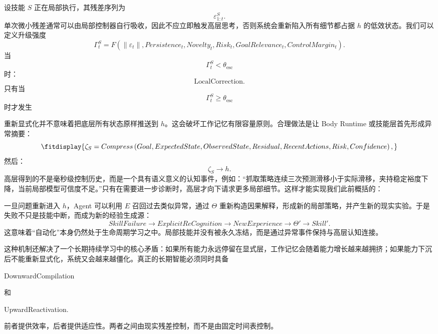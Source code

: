 设技能 $S$ 正在局部执行，其残差序列为
\[
\varepsilon_{1:t}^{S}.
\]
单次微小残差通常可以由局部控制器自行吸收，因此不应立即触发高层思考，否则系统会重新陷入所有细节都占据 $h$ 的低效状态。我们可以定义升级强度
\[
\Gamma_t^S
=
F
\left(
\|\varepsilon_t\|,
Persistence_t,
Novelty_t,
Risk_t,
GoalRelevance_t,
ControlMargin_t
\right).
\]
当
\[
\Gamma_t^S<\theta_{\mathrm{esc}}
\]
时：
\[
\mathrm{LocalCorrection}.
\]
只有当
\[
\Gamma_t^S\geq\theta_{\mathrm{esc}}
\]
时才发生
\begin{statementbox}
\centering
{}
\end{statementbox}

重新显式化并不意味着把底层所有状态原样推送到 $h$。这会破坏工作记忆有限容量原则。合理做法是让 Body Runtime 或技能层首先形成异常摘要：
\[
\fitdisplay{
\zeta_S
=
Compress
\left(
Goal,
ExpectedState,
ObservedState,
Residual,
RecentActions,
Risk,
Confidence
\right),
}
\]
然后：
\[
\zeta_S
\rightarrow h.
\]
高层得到的不是毫秒级控制历史，而是一个具有语义意义的认知事件，例如：“抓取策略连续三次预测滑移小于实际滑移，夹持稳定裕度下降，当前局部模型可信度不足。”只有在需要进一步诊断时，高层才向下请求更多局部细节。这样才能实现我们此前概括的：
\begin{statementbox}
\centering
{}
\end{statementbox}

一旦问题重新进入 $h$，Agent 可以利用 $E$ 召回过去类似异常，通过 $\Theta$ 重新构造因果解释，形成新的局部策略，并产生新的现实实验。于是失败不只是技能中断，而成为新的经验生成源：
\[
SkillFailure
\rightarrow
ExplicitReCognition
\rightarrow
NewExperience
\rightarrow
\Theta'
\rightarrow
Skill'.
\]
这意味着“自动化”本身仍然处于生命周期学习之中。局部技能并没有被永久冻结，而是通过异常事件保持与高层认知连接。

这种机制还解决了一个长期持续学习中的核心矛盾：如果所有能力永远停留在显式层，工作记忆会随着能力增长越来越拥挤；如果能力下沉后不能重新显式化，系统又会越来越僵化。真正的长期智能必须同时具备
\begin{statementbox}
DownwardCompilation
\end{statementbox}
和
\begin{statementbox}
UpwardReactivation.
\end{statementbox}
前者提供效率，后者提供适应性。两者之间由现实残差控制，而不是由固定时间表控制。

